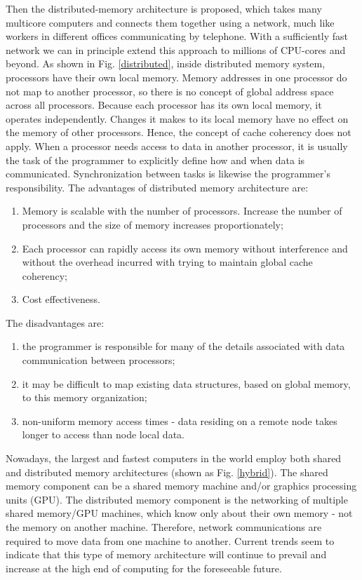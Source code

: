 Then the distributed-memory architecture is proposed, which takes many multicore computers and connects them together using a network, much like workers in different offices communicating by telephone. With a sufficiently fast network we can in principle extend this approach to millions of CPU-cores and beyond. As shown in Fig. \ref{distributed}, inside distributed memory system, processors have their own local memory. Memory addresses in one processor do not map to another processor, so there is no concept of global address space across all processors. Because each processor has its own local memory, it operates independently. Changes it makes to its local memory have no effect on the memory of other processors. Hence, the concept of cache coherency does not apply. When a processor needs access to data in another processor, it is usually the task of the programmer to explicitly define how and when data is communicated. Synchronization between tasks is likewise the programmer's responsibility. The advantages of distributed memory architecture are: 
\begin{enumerate}
	\item Memory is scalable with the number of processors. Increase the number of processors and the size of memory increases proportionately; 
	\item Each processor can rapidly access its own memory without interference and without the overhead incurred with trying to maintain global cache coherency;
	\item Cost effectiveness.
\end{enumerate}

The disadvantages are: 
\begin{enumerate}
	\item the programmer is responsible for many of the details associated with data communication between processors;
	\item it may be difficult to map existing data structures, based on global memory, to this memory organization;
	\item non-uniform memory access times - data residing on a remote node takes longer to access than node local data.
\end{enumerate}

Nowadays, the largest and fastest computers in the world employ both shared and distributed memory architectures (shown as Fig. \ref{hybrid}). The shared memory component can be a shared memory machine and/or graphics processing units (GPU). The distributed memory component is the networking of multiple shared memory/GPU machines, which know only about their own memory - not the memory on another machine. Therefore, network communications are required to move data from one machine to another. Current trends seem to indicate that this type of memory architecture will continue to prevail and increase at the high end of computing for the foreseeable future.

